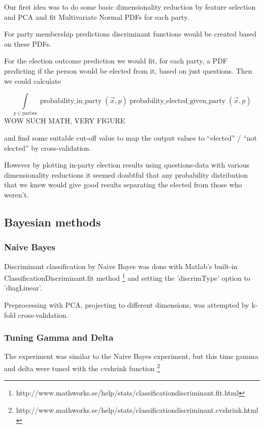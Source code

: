 \documentclass[a4paper,10pt]{article}
\begin{document}
Our first idea was to do some basic dimensionality reduction by feature selection and PCA and fit Multivariate Normal PDFs for each party.


For party membership predictions discriminant functions would be created based on these PDFs.


For the election outcome prediction we would fit, for each party, a PDF predicting if the person would be elected from it, based on just questions. Then we could calculate

\begin{equation}
\int\limits_{p \in \text{parties}} \operatorname{probability\_in\_party}(\vec{x}, p) \operatorname{probability\_elected\_given\_party}(\vec{x}, p)
\end{equation}
{\small WOW SUCH MATH, VERY FIGURE}

and find some suitable cut-off value to map the output values to “elected” / “not elected” by cross-validation.


However by plotting in-party election results using questions-data with various dimensionality reductions it seemed doubtful that any probability distribution that we knew would give good results separating the elected from those who weren’t.

\subsection{Bayesian methods}
\subsubsection{Naive Bayes}
Discriminant classification by Naive Bayes was done with Matlab’s built-in ClassificationDiscriminant.fit method \footnote{http://www.mathworks.se/help/stats/classificationdiscriminant.fit.html} and setting the 'discrimType' option to 'diagLinear'.

Preprocessing with PCA, projecting to different dimensions, was attempted by k-fold cross-validation.

\subsubsection{Tuning Gamma and Delta}

The experiment was similar to the Naive Bayes experiment, but this time gamma and delta were tuned with the cvshrink function
\footnote{http://www.mathworks.se/help/stats/classificationdiscriminant.cvshrink.html}
\end{document}
